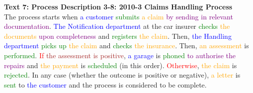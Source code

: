 \textbf{Text 7: Process Description 3-8: 2010-3 Claims Handling Process}\\
The process starts when \textcolor{blue}{a} \textcolor{blue}{customer} \textcolor{green}{submits} \textcolor{orange}{a} \textcolor{orange}{claim} \textcolor{purple}{by} \textcolor{purple}{sending} \textcolor{purple}{in} \textcolor{purple}{relevant} \textcolor{purple}{documentation}. \textcolor{blue}{The} \textcolor{blue}{Notification} \textcolor{blue}{department} at the car insurer \textcolor{green}{checks} \textcolor{orange}{the} \textcolor{orange}{documents} \textcolor{purple}{upon} \textcolor{purple}{completeness} and \textcolor{green}{registers} \textcolor{orange}{the} \textcolor{orange}{claim}. Then, \textcolor{blue}{the} \textcolor{blue}{Handling} \textcolor{blue}{department} \textcolor{green}{picks} \textcolor{green}{up} \textcolor{orange}{the} \textcolor{orange}{claim} and \textcolor{green}{checks} \textcolor{orange}{the} \textcolor{orange}{insurance}. Then, \textcolor{orange}{an} \textcolor{orange}{assessment} is \textcolor{green}{performed}. \textcolor{red}{If} \textcolor{brown}{the} \textcolor{brown}{assessment} \textcolor{brown}{is} \textcolor{brown}{positive}, \textcolor{blue}{a} \textcolor{blue}{garage} is \textcolor{green}{phoned} \textcolor{purple}{to} \textcolor{purple}{authorise} \textcolor{purple}{the} \textcolor{purple}{repairs} and \textcolor{orange}{the} \textcolor{orange}{payment} is \textcolor{green}{scheduled} (in this order). \textcolor{red}{Otherwise}, \textcolor{orange}{the} \textcolor{orange}{claim} is \textcolor{green}{rejected}. In any case (whether the outcome is positive or negative), \textcolor{orange}{a} \textcolor{orange}{letter} is \textcolor{green}{sent} to \textcolor{blue}{the} \textcolor{blue}{customer} and the process is considered to be complete.

